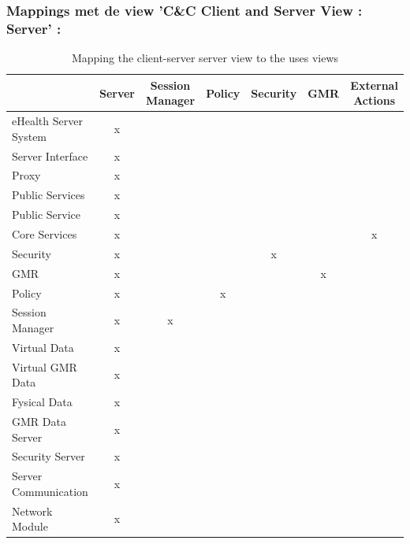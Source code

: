 \documentclass[a4paper,10pt]{article}
\begin{document}
\clearpage
\subsubsection*{Mappings met de view 'C\&C Client and Server View : Server' :}
\begin{table}[h!]
\begin{center}
 \begin{tabular}{l|c|c|c|c|c|c|} 
 & Server & Session Manager & Policy & Security & GMR & External Actions\\ \hline
eHealth Server System & x & & & & &  \\ \hline
\hspace{6pt}Server Interface & x & & & & & \\ \hline
\hspace{12pt}Proxy & x & & & & & \\ \hline
\hspace{6pt}Public Services & x & & & & & \\ \hline
\hspace{12pt}Public Service & x & & & & & \\ \hline
\hspace{6pt}Core Services & x & & & & & x \\ \hline
\hspace{12pt}Security & x & & & x & & \\ \hline
\hspace{12pt}GMR & x & & & & x & \\ \hline
\hspace{12pt}Policy & x & & x & & & \\ \hline
\hspace{12pt}Session Manager & x & x & & & & \\ \hline
\hspace{6pt}Virtual Data & x & & & & & \\ \hline
\hspace{12pt}Virtual GMR Data & x  & & & & & \\ \hline
\hspace{6pt}Fysical Data & x & & & & & \\ \hline
\hspace{12pt}GMR Data Server & x & & & & & \\ \hline
\hspace{12pt}Security Server & x & & & & & \\ \hline
\hspace{6pt}Server Communication & x & & & & & \\ \hline
\hspace{12pt}Network Module & x & & & & & \\ \hline
\end{tabular}
\caption{Mapping the client-server server view to the uses views}
\end{center}
\end{table}
\end{document}
